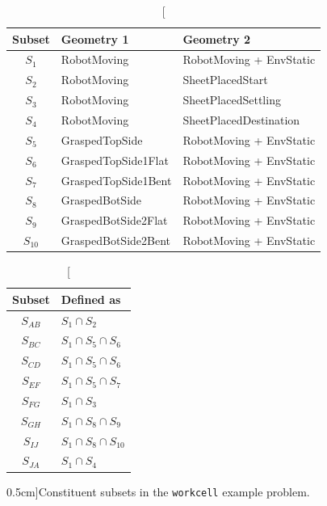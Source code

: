 \begin{table}
   \centering
   \begin{minipage}[t]{.65\textwidth}
   \begin{tabular}{cll}
      \toprule
      Subset & Geometry 1 & Geometry 2 \\
      \midrule
      $S_1$  & RobotMoving & RobotMoving + EnvStatic \\
      $S_2$  & RobotMoving & SheetPlacedStart \\
      $S_3$  & RobotMoving & SheetPlacedSettling \\
      $S_4$  & RobotMoving & SheetPlacedDestination \\
      $S_5$  & GraspedTopSide & RobotMoving + EnvStatic \\
      $S_6$  & GraspedTopSide1Flat & RobotMoving + EnvStatic \\
      $S_7$  & GraspedTopSide1Bent & RobotMoving + EnvStatic \\
      $S_8$  & GraspedBotSide & RobotMoving + EnvStatic \\
      $S_9$  & GraspedBotSide2Flat & RobotMoving + EnvStatic \\
      $S_{10}$ & GraspedBotSide2Bent & RobotMoving + EnvStatic \\
      \bottomrule
   \end{tabular}
   \end{minipage}
   \begin{minipage}[t]{.30\textwidth}
   \begin{tabular}{cl}
      \toprule
      Subset & Defined as \\
      \midrule
      $S_{AB}$  & $S_1 \cap S_2$ \\
      $S_{BC}$  & $S_1 \cap S_5 \cap S_6$ \\
      $S_{CD}$  & $S_1 \cap S_5 \cap S_6$ \\
      $S_{EF}$  & $S_1 \cap S_5 \cap S_7$ \\
      $S_{FG}$  & $S_1 \cap S_3$ \\
      $S_{GH}$  & $S_1 \cap S_8 \cap S_9$ \\
      $S_{IJ}$  & $S_1 \cap S_8 \cap S_{10}$ \\
      $S_{JA}$  & $S_1 \cap S_4$ \\
      \bottomrule
   \end{tabular}
   \end{minipage}
   \caption[][0.5cm]{Constituent subsets in the \texttt{workcell} example
      problem.}
   \label{table:family:workcell-subsets}
\end{table}


